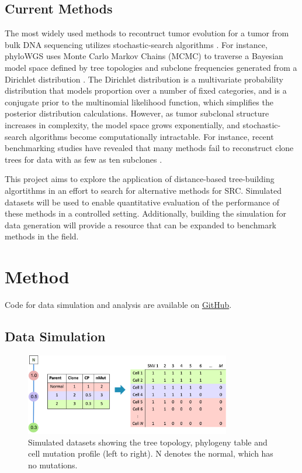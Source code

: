 \documentclass{article}
\begin{document}
\subsection{Current Methods}
The most widely used methods to recontruct tumor evolution for a tumor from bulk DNA sequencing utilizes stochastic-search algorithms \cite{phyloWGS,pyclone}. For instance, phyloWGS uses Monte Carlo Markov Chains (MCMC) to traverse a Bayesian model space defined by tree topologies and subclone frequencies generated from a Dirichlet distribution \cite{phyloWGS}. The Dirichlet distribution is a multivariate probability distribution that models proportion over a number of fixed categories, and is a conjugate prior to the multinomial likelihood function, which simplifies the posterior distribution calculations. However, as tumor subclonal structure increases in complexity, the model space grows exponentially, and stochastic-search algorithms become computationally intractable. For instance, recent benchmarking studies have revealed that many methods fail to reconstruct clone trees for data with as few as ten subclones \cite{pairtree}. 

This project aims to explore the application of distance-based tree-building algortithms in an effort to search for alternative methods for SRC. Simulated datasets will be used to enable quantitative evaluation of the performance of these methods in a controlled setting. Additionally, building the simulation for data generation will provide a resource that can be expanded to benchmark methods in the field.

\section{Method}
Code for data simulation and analysis are available on \href{https://github.com/whelena/BIOMATH211_Cancer-Phylogeny}{GitHub}.

\subsection{Data Simulation}
\begin{figure}[!ht]\centering\includegraphics[width=0.8\textwidth]{fig/sim.png}
    \caption{\label{fig:sim} Simulated datasets showing the tree topology, phylogeny table and cell mutation profile (left to right). N denotes the normal, which has no mutations.}
\end{figure}
    
\end{document}
